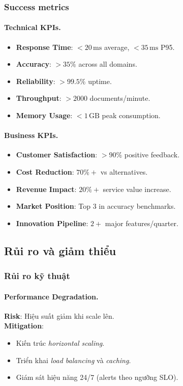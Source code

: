 \subsubsection{Success metrics}

\paragraph{Technical KPIs.}
\begin{itemize}
  \item \textbf{Response Time}: \(<20\,\mathrm{ms}\) average, \(<35\,\mathrm{ms}\) P95.
  \item \textbf{Accuracy}: \(>35\%\) across all domains.
  \item \textbf{Reliability}: \(>99.5\%\) uptime.
  \item \textbf{Throughput}: \(>2000\) documents/minute.
  \item \textbf{Memory Usage}: \(<1\,\mathrm{GB}\) peak consumption.
\end{itemize}

\paragraph{Business KPIs.}
\begin{itemize}
  \item \textbf{Customer Satisfaction}: \(>90\%\) positive feedback.
  \item \textbf{Cost Reduction}: \(70\%\!+\) vs alternatives.
  \item \textbf{Revenue Impact}: \(20\%\!+\) service value increase.
  \item \textbf{Market Position}: Top 3 in accuracy benchmarks.
  \item \textbf{Innovation Pipeline}: \(2+\) major features/quarter.
\end{itemize}



\subsection{Rủi ro và giảm thiểu}

\subsubsection{Rủi ro kỹ thuật}

\paragraph{Performance Degradation.}
\textbf{Risk}: Hiệu suất giảm khi scale lên.\\
\textbf{Mitigation}:
\begin{itemize}
  \item Kiến trúc \textit{horizontal scaling}.
  \item Triển khai \textit{load balancing} và \textit{caching}.
  \item Giám sát hiệu năng 24/7 (alerts theo ngưỡng SLO).
\end{itemize}

